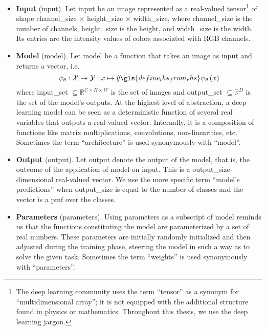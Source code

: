 \begin{itemize}
\item \textbf{Input} (\gls{input}). Let \gls{input} be an image represented as a real-valued tensor\footnote{The deep learning community uses the term ``tensor'' as a synonym for ``multidimensional array''; it is not equipped with the additional structure found in physics or mathematics. Throughout this thesis, we use the deep learning jargon.} of shape \gls{channel_size} $\times$ \gls{height_size} $\times$ \gls{width_size}, where \gls{channel_size} is the number of channels, \gls{height_size} is the height, and \gls{width_size} is the width. Its entries are the intensity values of colors associated with RGB channels.

\item \textbf{Model} (\gls{model}). Let \gls{model} be a function that takes an image as input and returns a vector, i.e.\
\begin{equation}
  \psi_\theta: \mathcal{X} \to \mathcal{Y}
  : x \mapsto \hat{y} \gls{define_lhs_from_rhs} \psi_\theta \left(x\right)
  \label{eq:model}
\end{equation}
where \gls{input_set} $\subseteq \mathbb{R}^{C \times H \times W}$ is the set of images and \gls{output_set} $\subseteq \mathbb{R}^{D}$ is the set of the model's outputs. At the highest level of abstraction, a deep learning model can be seen as a deterministic function of several real variables that outputs a real-valued vector. Internally, it is a composition of functions like matrix multiplications, convolutions, non-linearities, etc. Sometimes the term ``architecture'' is used synonymously with ``model''.

\item \textbf{Output} (\gls{output}). Let \gls{output} denote the output of the model, that is, the outcome of the application of \gls{model} on \gls{input}. This is a \gls{output_size}-dimensional real-valued vector. We use the more specific term ``model's predictions'' when \gls{output_size} is equal to the number of classes and the vector is a \acrfull{pmf} over the classes.

\item \textbf{Parameters} (\gls{parameters}). Using \gls{parameters} as a subscript of \gls{model}
reminds us that the functions constituting the model are parameterized by a set of real numbers. These parameters are initially randomly initialized and then adjusted during the training phase, steering the model in such a way as to solve the given task. Sometimes the term ``weights'' is used synonymously with ``parameters''.


\end{itemize}
